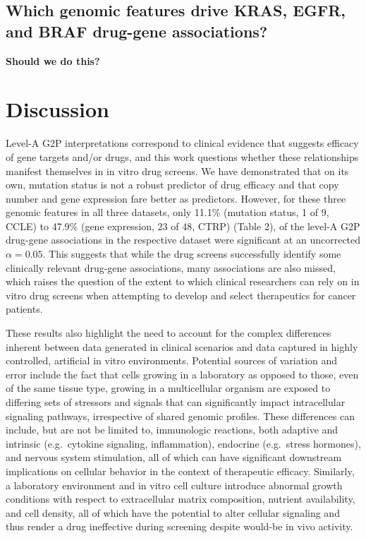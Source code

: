 \documentclass[man,floatsintext]{apa6}
\begin{document}
\subsection{Which genomic features drive KRAS, EGFR, and BRAF drug-gene
associations?}\label{which-genomic-features-drive-kras-egfr-and-braf-drug-gene-associations}

\textbf{Should we do this?}

\section{Discussion}\label{discussion}

Level-A G2P interpretations correspond to clinical evidence that
suggests efficacy of gene targets and/or drugs, and this work questions
whether these relationships manifest themselves in in vitro drug
screens. We have demonstrated that on its own, mutation status is not a
robust predictor of drug efficacy and that copy number and gene
expression fare better as predictors. However, for these three genomic
features in all three datasets, only 11.1\% (mutation status, 1 of 9,
CCLE) to 47.9\% (gene expression, 23 of 48, CTRP) (Table 2), of the
level-A G2P drug-gene associations in the respective dataset were
significant at an uncorrected \(\alpha = 0.05\). This suggests that
while the drug screens successfully identify some clinically relevant
drug-gene associations, many associations are also missed, which raises
the question of the extent to which clinical researchers can rely on in
vitro drug screens when attempting to develop and select therapeutics
for cancer patients.

These results also highlight the need to account for the complex
differences inherent between data generated in clinical scenarios and
data captured in highly controlled, artificial in vitro environments.
Potential sources of variation and error include the fact that cells
growing in a laboratory as opposed to those, even of the same tissue
type, growing in a multicellular organism are exposed to differing sets
of stressors and signals that can significantly impact intracellular
signaling pathways, irrespective of shared genomic profiles. These
differences can include, but are not be limited to, immunologic
reactions, both adaptive and intrinsic (e.g.~cytokine signaling,
inflammation), endocrine (e.g.~stress hormones), and nervous system
stimulation, all of which can have significant downstream implications
on cellular behavior in the context of therapeutic efficacy. Similarly,
a laboratory environment and in vitro cell culture introduce abnormal
growth conditions with respect to extracellular matrix composition,
nutrient availability, and cell density, all of which have the potential
to alter cellular signaling and thus render a drug ineffective during
screening despite would-be in vivo activity.
\end{document}
